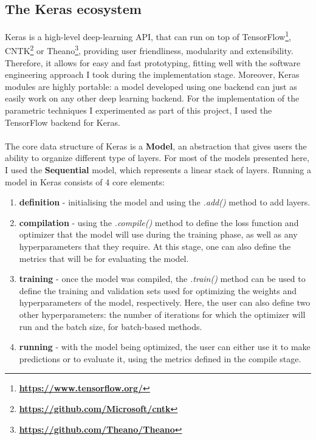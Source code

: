 	\subsection{The Keras ecosystem} \label{Section: impl/ml/ecosys}
	Keras is a high-level deep-learning API, that can run on top of TensorFlow\footnote{\textbf{\url{https://www.tensorflow.org/}}}, CNTK\footnote{\textbf{\url{https://github.com/Microsoft/cntk}}} or Theano\footnote{\textbf{\url{https://github.com/Theano/Theano}}}, providing user friendliness, modularity and extensibility. Therefore, it allows for easy and fast prototyping, fitting well with the software engineering approach I took during the implementation stage. Moreover, Keras modules are highly portable: a model developed using one backend can just as easily work on any other deep learning backend. For the implementation of the parametric techniques I experimented as part of this project, I used the TensorFlow backend for Keras. 
	\\ \\
	The core data structure of Keras is a \textbf{Model}, an abstraction that gives users the ability to organize different type of layers. For most of the models presented here, I used the \textbf{Sequential} model, which represents a linear stack of layers. Running a model in Keras consists of 4 core elements:
	\begin{enumerate}
		\item \textbf{definition} - initialising the model and using the \textit{.add()} method to add layers.
		\item \textbf{compilation} - using the \textit{.compile()} method to define the loss function and optimizer that the model will use during the training phase, as well as any hyperparameters that they require. At this stage, one can also define the metrics that will be for evaluating the model. 
		\item \textbf{training} - once the model was compiled, the \textit{.train()} method can be used to define the training and validation sets used for optimizing the weights and hyperparameters of the model, respectively. Here, the user can also define two other hyperparameters: the number of iterations for which the optimizer will run and the batch size, for batch-based methods. 
		\item \textbf{running} - with the model being optimized, the user can either use it to make predictions or to evaluate it, using the metrics defined in the compile stage. 
	\end{enumerate}
